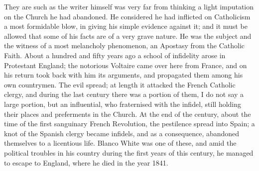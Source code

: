 They are such as the writer himself was very far from
thinking a light imputation on the Church he had
abandoned. He considered he had inflicted on Catholicism
a most formidable blow, in giving his simple evidence
against it; and it must be allowed that some of his facts
are of a very grave nature. He was the subject and the
witness of a most melancholy phenomenon, an Apostasy from
the Catholic Faith. About a hundred and fifty years ago a
school of infidelity arose in Protestant England; the
notorious Voltaire came over here from France, and on his
return took back with him its arguments, and propagated
them among his own countrymen. The evil spread; at length
it attacked the French Catholic clergy, and during the
last century there was a portion of them, I do not say a
large portion, but an influential, who fraternised with
the infidel, still holding their places and preferments
in the Church. At the end of the century, about the time
of the first sanguinary French Revolution, the pestilence
spread into Spain; a knot of the Spanish clergy became
infidels, and as a consequence, abandoned themselves to a
licentious life. Blanco White was one of these, and amid
the political troubles in his country during the first
years of this century, he managed to escape to England,
where he died in the year 1841.

